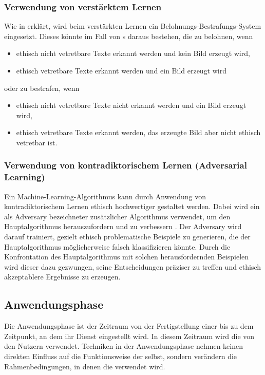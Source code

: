 \documentclass[hidelinks,12pt]{report}
\begin{document}
\subsubsection{Verwendung von verstärktem Lernen}
Wie in  erklärt, wird beim verstärkten Lernen ein Belohnungs-Bestrafungs-System eingesetzt. Dieses könnte im Fall von s daraus bestehen, die  zu belohnen, wenn 
\\
\begin{itemize}
    \item ethisch nicht vetretbare Texte erkannt werden und kein Bild erzeugt wird,
    \item ethisch vetretbare Texte erkannt werden und ein Bild erzeugt wird
\end{itemize}
oder zu bestrafen, wenn
\\
\begin{itemize}
    \item ethisch nicht vetretbare Texte nicht erkannt werden und ein Bild erzeugt wird,
    \item ethisch vetretbare Texte erkannt werden, das erzeugte Bild aber nicht ethisch vetretbar ist.
\end{itemize}  

\subsubsection{Verwendung von kontradiktorischem Lernen (Adversarial Learning)}
Ein Machine-Learning-Algorithmus kann durch Anwendung von kontradiktorischem Lernen ethisch hochwertiger gestaltet werden. Dabei wird ein als Adversary bezeichneter zusätzlicher Algorithmus verwendet, um den Hauptalgorithmus herauszufordern und zu verbessern \cite[S. 3]{Kurakin}. Der Adversary wird darauf trainiert, gezielt ethisch problematische Beispiele zu generieren, die der Hauptalgorithmus möglicherweise falsch klassifizieren könnte. Durch die Konfrontation des Hauptalgorithmus mit solchen herausfordernden Beispielen wird dieser dazu gezwungen, seine Entscheidungen präziser zu treffen und ethisch akzeptablere Ergebnisse zu erzeugen.
\\
\subsection{Anwendungsphase}
Die Anwendungsphase ist der Zeitraum von der Fertigstellung einer  bis zu dem Zeitpunkt, an dem ihr Dienst eingestellt wird. In diesem Zeitraum wird die  von den Nutzern verwendet. Techniken in der Anwendungsphase nehmen keinen direkten Einfluss auf die Funktionsweise der  selbst, sondern verändern die Rahmenbedingungen, in denen die  verwendet wird.
\\
\end{document}
